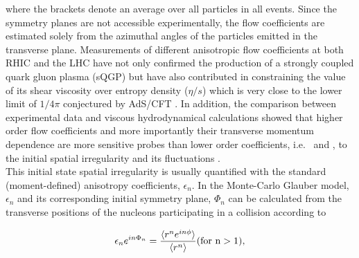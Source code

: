 \documentclass[ALICE,manyauthors]{cernphprep}
\begin{document}
where the brackets denote an average over all particles in all events. Since the symmetry planes are not accessible experimentally, the flow coefficients are estimated solely from the azimuthal angles of the particles emitted in the transverse plane. Measurements of different anisotropic flow coefficients at both RHIC \cite{Adams:2003am,Abelev:2007qg,Adler:2003kt,Adare:2006ti,Alver:2007qw,Adcox:2002ms,Adamczyk:2013gw,Adler:2004cj,Afanasiev:2009wq,Adare:2011tg,Ackermann:2000tr,Adler:2001nb,Adler:2002ct,Adler:2002pu,Adams:2003zg,Adams:2004wz,Adams:2004bi} and the LHC \cite{Aamodt:2010pa, ALICE:2011ab, Abelev:2012di, Chatrchyan:2012xq, Chatrchyan:2012ta, ATLAS:2011ah, ATLAS:2012at,Abelev:2014pua,Adam:2016nfo,Adam:2016izf, Acharya:2018zuq,
Chatrchyan:2013kba, Adam:2015eta, Acharya:2018lmh,Acharya:2018ihu} have not only confirmed the production of a strongly coupled quark gluon plasma (sQGP) but have also contributed in constraining the value of its shear viscosity over entropy density ($\eta/s$) which is very close to the lower limit of $1/4\pi$ conjectured by AdS/CFT \cite{Kovtun:2004de}. In addition, the comparison between experimental data \cite{Adam:2016izf} and viscous hydrodynamical calculations \cite{Niemi:2015voa} showed that higher order flow coefficients and more importantly their transverse momentum dependence are more sensitive probes than lower order coefficients, i.e. \vtwo~and \vthree, to the initial spatial irregularity and its fluctuations \cite{Alver:2010dn}.\\ %
This initial state spatial irregularity is usually quantified with the standard (moment-defined) anisotropy coefficients, $\epsilon_{n}$. In the Monte-Carlo Glauber model, $\epsilon_{n}$ and its corresponding initial symmetry plane, $\Phi_n$ can be calculated from the transverse positions of the nucleons participating in a collision according to \cite{Teaney:2010vd, Alver:2010gr}

\begin{equation}
\epsilon_{n}e^{in\Phi_n} = \frac{\langle{r^{n}e^{in\phi}}\rangle}{\langle r^n\rangle}  (\rm{for}~n>1),
\label{Eq:epsilonn}
\end{equation}
\end{document}
